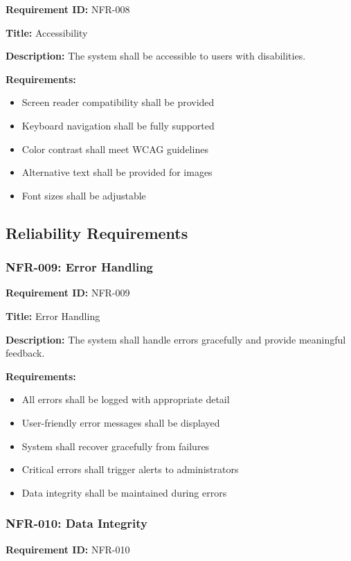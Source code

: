 \documentclass[12pt,a4paper]{article}
\begin{document}
\textbf{Requirement ID:} NFR-008

\textbf{Title:} Accessibility

\textbf{Description:} The system shall be accessible to users with disabilities.

\textbf{Requirements:}
\begin{itemize}
    \item Screen reader compatibility shall be provided
    \item Keyboard navigation shall be fully supported
    \item Color contrast shall meet WCAG guidelines
    \item Alternative text shall be provided for images
    \item Font sizes shall be adjustable
\end{itemize}

\subsection{Reliability Requirements}

\subsubsection{NFR-009: Error Handling}

\textbf{Requirement ID:} NFR-009

\textbf{Title:} Error Handling

\textbf{Description:} The system shall handle errors gracefully and provide meaningful feedback.

\textbf{Requirements:}
\begin{itemize}
    \item All errors shall be logged with appropriate detail
    \item User-friendly error messages shall be displayed
    \item System shall recover gracefully from failures
    \item Critical errors shall trigger alerts to administrators
    \item Data integrity shall be maintained during errors
\end{itemize}

\subsubsection{NFR-010: Data Integrity}

\textbf{Requirement ID:} NFR-010
\end{document}
